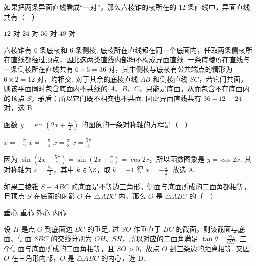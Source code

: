\begin{problem}
如果把两条异面直线看成“一对”，那么六棱锥的棱所在的 \(12\) 条直线中，异面直线共有（\(\quad\)）

\choices
    {\(12\) 对}
    {\(24\) 对}
    {\(36\) 对}
    {\(48\) 对}


\begin{solution}
六棱锥有 \(6\) 条底棱和 \(6\) 条侧棱. 底棱所在直线都在同一个底面内，任取两条侧棱所在直线都经过顶点，因此这两类直线内部均不构成异面直线. 一条底棱所在直线与一条侧棱所在直线共有 \(6\times6=36\) 对，其中侧棱与底棱有公共端点的情形为 \(6\times2=12\) 对，均相交. 对于其余的底棱直线 \(AB\) 和侧棱直线 \(SC\)，若它们共面，则该平面同时包含底面内不共线的 \(A\)、\(B\)、\(C\)，只能是底面，从而包含不在底面内的顶点 \(S\)，矛盾；所以它们既不相交也不共面. 因此异面直线共有 \(36-12=24\) 对，选 B.
\end{solution}
\end{problem}

\begin{problem}
函数 \(y=\sin\left(2x+\frac{5\pi}{2}\right)\) 的图象的一条对称轴的方程是（\(\quad\)）

\choices
    {\(x = -\frac{\pi}{2}\)}
    {\(x = -\frac{\pi}{4}\)}
    {\(x = \frac{\pi}{8}\)}
    {\(x = \frac{5\pi}{4}\)}


\begin{solution}
因为 \(\sin\left(2x+\frac{5\pi}{2}\right)=\sin\left(2x+\frac{\pi}{2}\right)=\cos2x\)，所以函数图象是 \(y=\cos2x\). 其对称轴为 \(x=\frac{k\pi}{2}\)，其中 \(k\in\Z\)，取 \(k=-1\) 得 \(x=-\frac{\pi}{2}\). 故选 A.
\end{solution}
\end{problem}

\begin{problem}
如果三棱锥 \(S-ABC\) 的底面是不等边三角形，侧面与底面所成的二面角都相等，且顶点 \(S\) 在底面的射影 \(O\) 在 \(\triangle ABC\) 内，那么 \(O\) 是 \(\triangle ABC\) 的（\(\quad\)）

\choices
    {垂心}
    {重心}
    {外心}
    {内心}


\begin{solution}
设 \(H\) 是点 \(O\) 到底面边 \(BC\) 的垂足. 过 \(SO\) 作垂直于 \(BC\) 的截面，则该截面与底面、侧面 \(SBC\) 的交线分别为 \(OH\)、\(SH\)，所以对应的二面角满足 \(\tan\theta=\frac{SO}{OH}\). 三个侧面与底面所成的二面角相等，且 \(SO>0\)，故点 \(O\) 到三条边的距离相等. 又因 \(O\) 在三角形内部，\(O\) 是 \(\triangle ABC\) 的内心，选 D.
\end{solution}
\end{problem}

